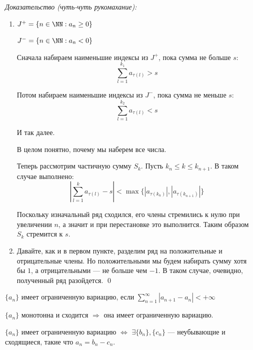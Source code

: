 \textit{Доказательство (чуть-чуть рукомахание):}
\begin{enumerate}
    \item
        \( J^+ = \{ n \in \NN : a_n \geq 0 \} \)

        \( J^- = \{ n \in \NN : a_n < 0 \} \)

        Сначала набираем наименьшие индексы из \( J^+ \), пока сумма не больше \( s \):
        \[
            \sum\limits_{l = 1}^{k_1} a_{\tau(l)} > s
        \]

        Потом набираем наименьшие индексы из \( J^- \), пока сумма не меньше \( s \):
        \[
            \sum\limits_{l = 1}^{k_2} a_{\tau(l)} < s
        \]

        И так далее.

        В целом понятно, почему мы наберем все числа.

        Теперь рассмотрим частичную сумму \( S_k \).
        Пусть \( k_n \leq k \leq k_{n + 1} \).
        В таком случае выполнено:
        \[
            \left| \sum\limits_{l = 1}^{k} a_{\tau(l)} - s \right| < \max \{ | a_{\tau(k_n)} |, | a_{\tau(k_{n + 1})} | \}
        \]

        Поскольку изначальный ряд сходился, его члены стремились к нулю при увеличении \( n \),
        а значит и при перестановке это выполнится.
        Таким образом \( S_k \) стремится к \( s \).
    \item
        Давайте, как и в первом пункте, разделим ряд на положительные и отрицательные члены.
        Но положительными мы будем набирать сумму хотя бы \( 1 \),
        а отрицательными --- не больше чем \( -1 \).
        В таком случае, очевидно, полученный ряд разойдется.
\qed
\end{enumerate}

\begin{defn}{}{}
    \( \{ a_n \} \) имеет ограниченную вариацию,
    если \( \sum\limits_{n = 1}^{\infty} |a_{n + 1} - a_n| < +\infty \)
\end{defn}

\begin{example}{}{}
    \( \{ a_n \} \) монотонна и сходится \( \Rightarrow \) она имеет ограниченную вариацию.
\end{example}

\begin{assrt}{}{}
    \( \{ a_n \} \) имеет ограниченную вариацию
    \( \Leftrightarrow \)
    \( \exists \{ b_n \}, \{ c_n \} \) --- неубывающие и сходящиеся,
    такие что \( a_n = b_n - c_n \).
\end{assrt}

